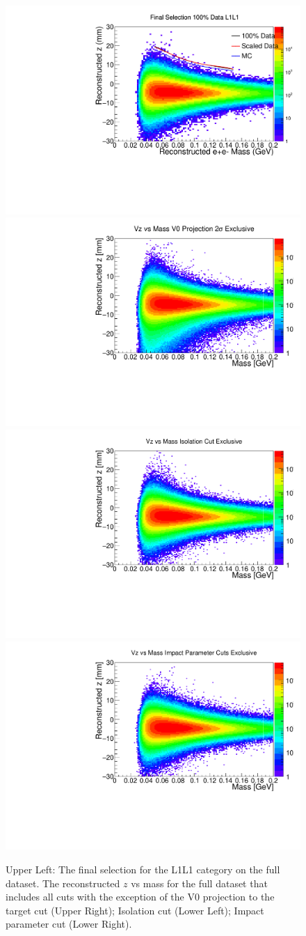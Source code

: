 \begin{figure}[t]
    \centering
    \includegraphics[width=.45\textwidth]{figs/Results/unblind_L1L1_final_zcut.pdf}
    \includegraphics[width=.45\textwidth]{figs/Results/unblind_cutflow_V0proj_n_1_z.pdf}
    \includegraphics[width=.45\textwidth]{figs/Results/unblind_cutflow_isocut_n_1_z.pdf}
    \includegraphics[width=.45\textwidth]{figs/Results/unblind_cutflow_IP_n_1_z.pdf}
    \caption{Upper Left: The final selection for the L1L1 category on the full dataset. The reconstructed $z$ vs mass for the full dataset that includes all cuts with the exception of the V0 projection to the target cut (Upper Right); Isolation cut (Lower Left); Impact parameter cut (Lower Right). %
    }
    \label{fig:n_1_full}
\end{figure}

